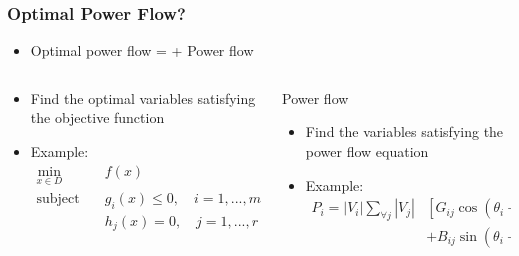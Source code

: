 \documentclass[
	11pt, %
	aspectratio=169, %
]{beamer}
\begin{document}
\begin{frame}
	\frametitle{Optimal Power Flow?}

	\begin{itemize}
	\item Optimal power flow = \color{blue}{Optimization problem} + \alert{Power flow}
	\end{itemize}

	\begin{columns}
	
	\begin{column}{0.5\textwidth}
	\begin{block}{\color{blue}{Optimization problem}}
		\begin{itemize}
		\item Find the optimal variables satisfying the objective function
		\item Example: 
			\begin{align*} 
				\min_{x\in D} \quad & f(x) \\
				\text{subject to} \quad & g_{i}(x) \leq 0, \quad i=1,...,m \\
				& h_{j}(x) = 0, \quad j=1,...,r
			\end{align*}
		\end{itemize}
	\end{block}
	\end{column}

	\begin{column}{0.5\textwidth}
	\begin{block}{\alert{Power flow}}
		\begin{itemize}
		\item Find the variables satisfying the power flow equation
		\item Example:
			\begin{align*} 
				P_{i} = \left|V_{i}\right| \sum_{\forall j} \left|V_{j}\right|
				& \left[
				G_{ij}\cos \left(\theta_{i} - \theta_{j} \right) \right.\\
				&\left.+ B_{ij}\sin \left(\theta_{i} - \theta_{j} \right) \right]
			\end{align*}
		\end{itemize}
	\end{block}
	\end{column}

	\end{columns}

\end{frame}


\end{document}
